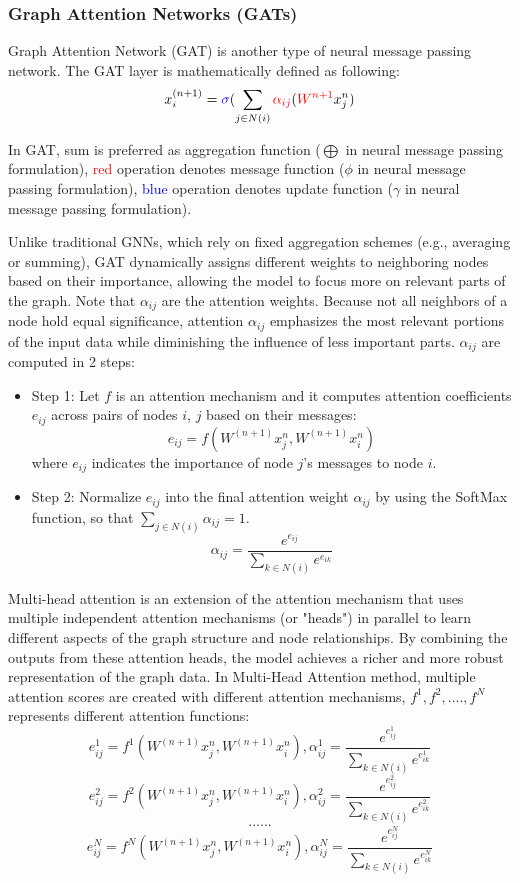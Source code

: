 \subsubsection{Graph Attention Networks (GATs)}\label{subsec:graph-attention-networks-(gats)}
Graph Attention Network (GAT) is another type of neural message passing network. The GAT layer is mathematically defined as following: $$x_i^{(n+1)} = \textcolor{blue}{\sigma}(\sum_{j \in N(i)} \textcolor{red}{\alpha_{ij}}(\textcolor{red}{W^{n+1}}x_j^n)$$


In GAT, sum is preferred as aggregation function ($\bigoplus$ in neural message passing formulation), \textcolor{red}{red} operation denotes message function ($\phi$  in neural message passing formulation), \textcolor{blue}{blue} operation denotes update function ($\gamma$ in neural message passing formulation).

Unlike traditional GNNs, which rely on fixed aggregation schemes (e.g., averaging or summing), GAT dynamically assigns different weights to neighboring nodes based on their importance, allowing the model to focus more on relevant parts of the graph.
Note that $\alpha_{ij}$ are the attention weights.
Because not all neighbors of a node hold equal significance, attention $\alpha_{ij}$ emphasizes the most relevant portions of the input data while diminishing the influence of less important parts. $\alpha_{ij}$ are computed in 2 steps:


\begin{itemize}
  \item Step 1: Let $f$ is an attention mechanism and it computes attention coefficients $e_{ij}$ across pairs of nodes $i$, $j$ based on their messages: $$ e_{ij} = f(W^{(n+1)}x_j^n, W^{(n+1)}x_i^n) $$ where $e_{ij}$ indicates the importance of node $j$’s messages to node $i$.
  \item Step 2: Normalize $e_{ij}$ into the final attention weight $\alpha_{ij}$ by using the SoftMax function, so that $\sum_{j \in N(i)} \alpha_{ij} = 1 $. $$ \alpha_{ij} = \frac{e^{e_{ij}}}{\sum_{k \in N(i)} e^{e_{ik}}} $$
\end{itemize}


Multi-head attention is an extension of the attention mechanism that uses multiple independent attention mechanisms (or "heads") in parallel to learn different aspects of the graph structure and node relationships.
By combining the outputs from these attention heads, the model achieves a richer and more robust representation of the graph data.
In Multi-Head Attention method, multiple attention scores are created with different attention mechanisms, $ f^1, f^2, .... , f^N $ represents different attention functions: $$ e_{ij}^1 = f^1(W^{(n+1)}x_j^n, W^{(n+1)}x_i^n), \alpha_{ij}^1 = \frac{e^{e_{ij}^1}}{\sum_{k \in N(i)} e^{e_{ik}^1}} $$ $$ e_{ij}^2 = f^2(W^{(n+1)}x_j^n, W^{(n+1)}x_i^n), \alpha_{ij}^2 = \frac{e^{e_{ij}^2}}{\sum_{k \in N(i)} e^{e_{ik}^2}} $$ $$ ...... $$ $$ e_{ij}^N = f^N(W^{(n+1)}x_j^n, W^{(n+1)}x_i^n), \alpha_{ij}^N = \frac{e^{e_{ij}^N}}{\sum_{k \in N(i)} e^{e_{ik}^N}} $$


